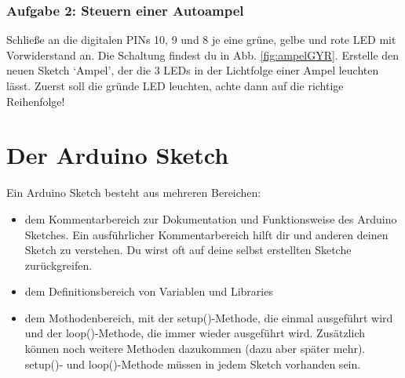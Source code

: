 \subsubsection{Aufgabe 2: Steuern einer Autoampel}

Schließe an die digitalen PINs 10, 9 und 8 je eine grüne, gelbe und rote LED mit Vorwiderstand an. Die Schaltung findest du in Abb. \ref{fig:ampelGYR}. Erstelle den neuen Sketch `Ampel', der die 3 LEDs in der Lichtfolge einer Ampel leuchten lässt. Zuerst soll die gründe LED leuchten, achte dann auf die richtige Reihenfolge!


\section{Der Arduino Sketch}

Ein Arduino Sketch besteht aus mehreren  Bereichen:

\begin{itemize}
\item dem Kommentarbereich zur Dokumentation und Funktionsweise des Arduino Sketches. Ein ausführlicher Kommentarbereich hilft dir und anderen deinen Sketch zu verstehen. Du wirst oft auf deine selbst erstellten Sketche zurückgreifen.   
\item dem Definitionsbereich von Variablen 
  und Libraries
\item dem Mothodenbereich, mit der setup()-Methode, die einmal ausgeführt wird und der loop()-Methode, die immer wieder ausgeführt wird. Zusätzlich können noch weitere Methoden dazukommen (dazu aber später mehr). setup()- und loop()-Methode müssen in jedem Sketch vorhanden sein. 
\end{itemize}


